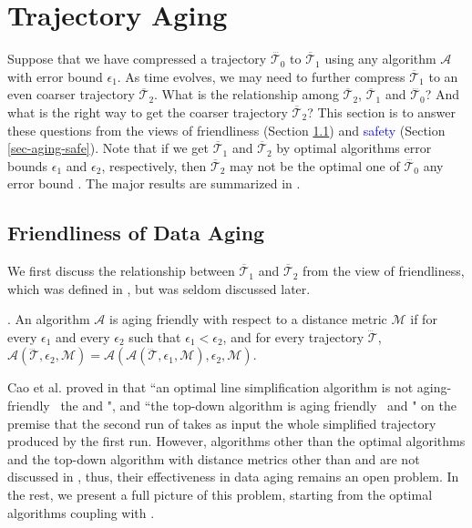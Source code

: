 
{\section{Trajectory Aging}}
\label{sec-aging}

Suppose that we have compressed a trajectory $\dddot{\mathcal{T}_0}$ to $\overline{\mathcal{T}}_1$ using any \lsa algorithm $\mathcal{A}$ with error bound $\epsilon_1$. As time evolves, we may need to further compress $\overline{\mathcal{T}}_1$ to an even coarser trajectory $\overline{\mathcal{T}}_2$.
What is the relationship among $\overline{\mathcal{T}}_2$, $\overline{\mathcal{T}}_1$ and $\dddot{\mathcal{T}_0}$? And what is the right way to get the coarser trajectory $\overline{\mathcal{T}}_2$?
%
This section is to answer these questions from the views of friendliness \cite{Cao:Spatio} (Section \ref{sec-aging-friend}) and \textcolor{blue}{safety} (Section \ref{sec-aging-safe}).
Note that if we get $\overline{\mathcal{T}}_1$ and $\overline{\mathcal{T}}_2$ by optimal algorithms \wrt error bounds $\epsilon_1$ and $\epsilon_2$, respectively, then $\overline{\mathcal{T}}_2$ may not be the optimal one of $\dddot{\mathcal{T}_0}$ \wrt any error bound \cite{Cao:Spatio}. The major results are summarized in .


\subsection{Friendliness of Data Aging}
\label{sec-aging-friend}
We first discuss the relationship between $\overline{\mathcal{T}}_1$ and $\overline{\mathcal{T}}_2$ from the view of friendliness, which was defined in \cite{Cao:Spatio}, but was seldom discussed later.
	
. {An \lsa algorithm $\mathcal{A}$ is aging friendly with respect to a distance metric $\mathcal{M}$ if for every $\epsilon_1$ and every $\epsilon_2$ such that $\epsilon_1 < \epsilon_2$, and for every trajectory $\dddot{\mathcal{T}}$, $\mathcal{A}(\dddot{\mathcal{T}}, \epsilon_2, \mathcal{M})= \mathcal{A}(\mathcal{A}(\dddot{\mathcal{T}}, \epsilon_1, \mathcal{M}), \epsilon_2, \mathcal{M})$.}

Cao et al. proved in \cite{Cao:Spatio} that ``an optimal line simplification algorithm is not aging-friendly \wrt~the \ped and \sed", and ``the top-down algorithm \dpa is aging friendly \wrt~\ped and \sed" on the premise that the second run of \dpa takes as input the whole simplified trajectory produced by the first run.
However, algorithms other than the optimal algorithms and the top-down algorithm \dpa with distance metrics other than \ped and \sed are not discussed in \cite{Cao:Spatio}, thus, their effectiveness in data aging remains an open problem.
In the rest, we  present a full picture of this problem, starting from the optimal algorithms coupling with \dad.

